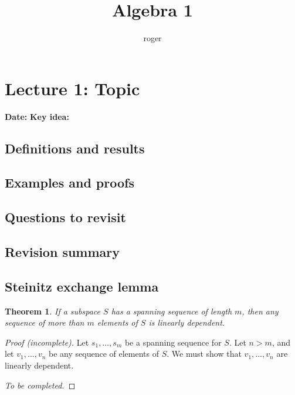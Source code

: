 \documentclass[11pt,a4paper]{article}
\title{Algebra 1}
\author{roger}
\date{}
\newcommand{\manualnumber}{}
\newtheorem*{manualtheorem}{Theorem \manualnumber}
\theoremstyle{definition}
\begin{document}
\maketitle
\tableofcontents

\section{Lecture 1: Topic}\label{sec:lecture-1}
\noindent\textbf{Date:} \hfill \textbf{Key idea:}

\subsection{Definitions and results}

\subsection{Examples and proofs}

\subsection{Questions to revisit}

\subsection{Revision summary}

\subsection{Steinitz exchange lemma}
\renewcommand{\manualnumber}{2.15}
\begin{manualtheorem}
If a subspace $S$ has a spanning sequence of length $m$, then any
sequence of more than $m$ elements of $S$ is linearly dependent.
\end{manualtheorem}

\begin{proof}[Proof (incomplete)]
\renewcommand{\qedsymbol}{}
Let $s_1,\ldots,s_m$ be a spanning sequence for $S$.
Let $n>m$, and let $v_1,\ldots,v_n$ be any sequence of elements of $S$.
We must show that $v_1,\ldots,v_n$ are linearly dependent.

\emph{To be completed.}
\end{proof}
\end{document}
